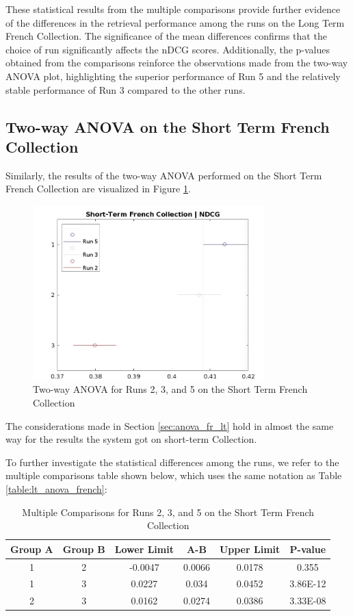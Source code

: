 These statistical results from the multiple comparisons provide further evidence of the differences in the retrieval performance among the runs on the Long Term French Collection. The significance of the mean differences confirms that the choice of run significantly affects the \ac{nDCG} scores. Additionally, the p-values obtained from the comparisons reinforce the observations made from the two-way \ac{ANOVA} plot, highlighting the superior performance of Run 5 and the relatively stable performance of Run 3 compared to the other runs.

\newpage
\subsection{Two-way ANOVA on the Short Term French Collection}

Similarly, the results of the two-way \ac{ANOVA} performed on the Short Term French Collection are visualized in Figure \ref{fig:st_anova_french}. 

\begin{figure}[!h]
\centering
\includegraphics[width=0.8\textwidth]{figure/StatisticalAnalysis/ANOVA 2/ndcg-st-fr.jpeg}
\caption{Two-way \ac{ANOVA} for Runs 2, 3, and 5 on the Short Term French Collection}
\label{fig:st_anova_french}
\end{figure}

The considerations made in Section \ref{sec:anova_fr_lt} hold in almost the same way for the results the system got on short-term Collection.  

To further investigate the statistical differences among the runs, we refer to the multiple comparisons table shown below, which uses the same notation as Table \ref{table:lt_anova_french}:

\begin{table}[!h]
\centering
\caption{Multiple Comparisons for Runs 2, 3, and 5 on the Short Term French Collection}
\label{table:st_anova_french}
\begin{tabular}{cccccc}
\hline
Group A & Group B & Lower Limit & A-B & Upper Limit & P-value \\ \hline
1 & 2 & -0.0047 & 0.0066 & 0.0178 & 0.355 \\
1 & 3 & 0.0227 & 0.034 & 0.0452 & 3.86E-12 \\
2 & 3 & 0.0162 & 0.0274 & 0.0386 & 3.33E-08 \\ \hline
\end{tabular}
\end{table}
 
